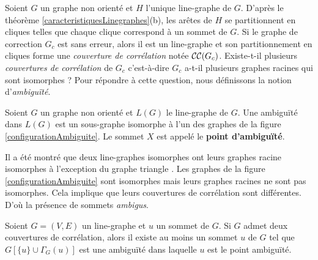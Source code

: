 Soient $G$ un graphe non orient\'e et $H$ l'unique  line-graphe de $G$.
D'apr\`es le th\'eor\`eme \ref{caracteristiquesLinegraphes}(b), les ar\^etes de $H$ se partitionnent en cliques telles que chaque clique correspond \`a un sommet de $G$. 
\newline
Si le graphe de correction $G_c$ est sans erreur, alors il est un line-graphe et son partitionnement en cliques forme une {\em couverture de corr\'elation} not\'ee ${\cal CC}(G_c)$.
Existe-t-il plusieurs {\em couvertures de corr\'elation} de $G_c$ c'est-\`a-dire $G_c$ a-t-il plusieurs graphes racines qui sont isomorphes ?
Pour r\'epondre \`a cette question, nous d\'efinissons la notion d'{\em ambigu\"{i}t\'e}. 
\newline

\begin{definition}
Soient $G$ un graphe non orient\'e et $L(G)$ le line-graphe de $G$. 
\newline
Une ambigu\"{i}t\'e dans $L(G)$ est un sous-graphe isomorphe \`a l'un des graphes de la figure \ref{configurationAmbiguite}. Le sommet $X$ est appel\'e le {\bf point d'ambigu\"{i}t\'e}.
\end{definition}

Il a \'et\'e montr\'e que deux line-graphes isomorphes ont leurs graphes racine isomorphes \`a l'exception du graphe triangle \cite{whitney1932congruent}. Les graphes de la figure \ref{configurationAmbiguite} sont isomorphes mais leurs graphes racines ne sont pas isomorphes. Cela implique que leurs couvertures de corr\'elation sont diff\'erentes. D'o\`u la pr\'esence de sommets {\em ambigus}.

\begin{lemma}
	Soient $G = (V,E)$ un line-graphe  et $u$ un sommet de $G$. 
	\newline
	Si $G$ admet deux couvertures de corr\'elation, alors il existe au moins un sommet $u$ de $G$ tel que $G[\{u\} \cup \Gamma_{G}(u)]$ est une ambigu\"{i}t\'e dans laquelle $u$ est le point ambigu\"{i}t\'e.
\end{lemma}
	
